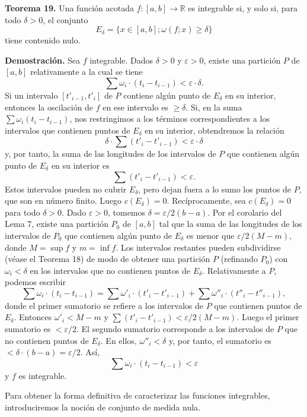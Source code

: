 \documentclass[12pt,oneside]{book}
\begin{document}
\textbf{Teorema 19.} Una función acotada \(f: [a, b] \to \mathbb{R}\) es integrable si, y solo si, para todo \(\delta > 0\), el conjunto
\[
E_\delta = \{x \in [a, b]; \omega(f;x) \geq \delta\}
\]
tiene contenido nulo.

\textbf{Demostración.} Sea \(f\) integrable. Dados \(\delta > 0\) y \(\varepsilon > 0\), existe una partición \(P\) de \([a, b]\) relativamente a la cual se tiene
\[
\sum \omega_i \cdot (t_i - t_{i-1}) < \varepsilon \cdot \delta.
\]
Si un intervalo \([t'_{i-1}, t'_i]\) de \(P\) contiene algún punto de \(E_\delta\) en su interior, entonces la oscilación de \(f\) en ese intervalo es \(\geq \delta\). Si, en la suma \(\sum \omega_i(t_i - t_{i-1})\), nos restringimos a los términos correspondientes a los intervalos que contienen puntos de \(E_\delta\) en su interior, obtendremos la relación
\[
\delta \cdot \sum (t'_i - t'_{i-1}) < \varepsilon \cdot \delta
\]
y, por tanto, la suma de las longitudes de los intervalos de \(P\) que contienen algún punto de \(E_\delta\) en su interior es
\[
\sum (t'_i - t'_{i-1}) < \varepsilon.
\]
Estos intervalos pueden no cubrir \(E_\delta\), pero dejan fuera a lo sumo los puntos de \(P\), que son en número finito. Luego \(c(E_\delta) = 0\). Recíprocamente, sea \(c(E_\delta) = 0\) para todo \(\delta > 0\). Dado \(\varepsilon > 0\), tomemos \(\delta = \varepsilon/2(b - a)\). Por el corolario del Lema 7, existe una partición \(P_0\) de \([a, b]\) tal que la suma de las longitudes de los intervalos de \(P_0\) que contienen algún punto de \(E_\delta\) es menor que \(\varepsilon/2(M - m)\), donde \(M = \sup f\) y \(m = \inf f\). Los intervalos restantes pueden subdividirse (véase el Teorema 18) de modo de obtener una partición \(P\) (refinando \(P_0\)) con \(\omega_i < \delta\) en los intervalos que no contienen puntos de \(E_\delta\). Relativamente a \(P\), podemos escribir
\[
\sum \omega_i \cdot (t_i - t_{i-1}) = \sum \omega'_i \cdot (t'_i - t'_{i-1}) + \sum \omega''_i \cdot (t''_i - t''_{i-1}),
\]
donde el primer sumatorio se refiere a los intervalos de \(P\) que contienen puntos de \(E_\delta\). Entonces \(\omega'_i < M - m\) y \(\sum (t'_i - t'_{i-1}) < \varepsilon/2(M - m)\). Luego el primer sumatorio es \(< \varepsilon/2\). El segundo sumatorio corresponde a los intervalos de \(P\) que no contienen puntos de \(E_\delta\). En ellos, \(\omega''_i < \delta\) y, por tanto, el sumatorio es \(< \delta \cdot (b - a) = \varepsilon/2\). Así,
\[
\sum \omega_i \cdot (t_i - t_{i-1}) < \varepsilon
\]
y \(f\) es integrable.

Para obtener la forma definitiva de caracterizar las funciones integrables, introduciremos la noción de conjunto de medida nula.
\end{document}
